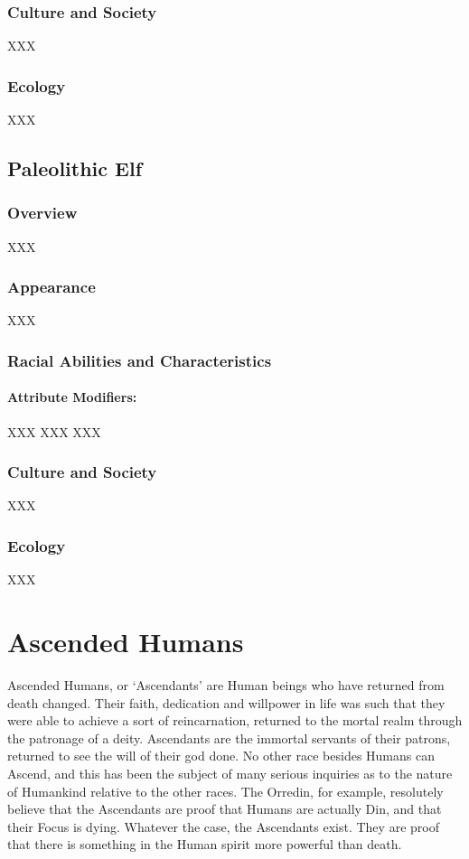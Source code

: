 \documentclass[oneside,11pt,english]{book}
\begin{document}
\subsubsection*{Culture and Society} 
XXX 
\subsubsection*{Ecology} 
XXX 
\subsection{Paleolithic Elf}
\subsubsection*{Overview} 
XXX 
\subsubsection*{Appearance} 
XXX 
\subsubsection*{Racial Abilities and Characteristics} 
\paragraph{Attribute Modifiers:} XXX 
XXX 
XXX 
\subsubsection*{Culture and Society} 
XXX 
\subsubsection*{Ecology} 
XXX 
\section{Ascended Humans}
Ascended Humans, or ‘Ascendants’ are Human beings who have returned from death changed. Their faith, dedication and willpower in life was such that they were able to achieve a sort of reincarnation, 
returned to the mortal realm through the patronage of a deity. Ascendants are the immortal servants of 
their patrons, returned to see the will of their god done. No other race besides Humans can Ascend, and 
this has been the subject of many serious inquiries as to the nature of Humankind relative to the other 
races. The Orredin, for example, resolutely believe that the Ascendants are proof that Humans are actually 
Din, and that their Focus is dying. Whatever the case, the Ascendants exist. They are proof that there is 
something in the Human spirit more powerful than death. 
\end{document}
